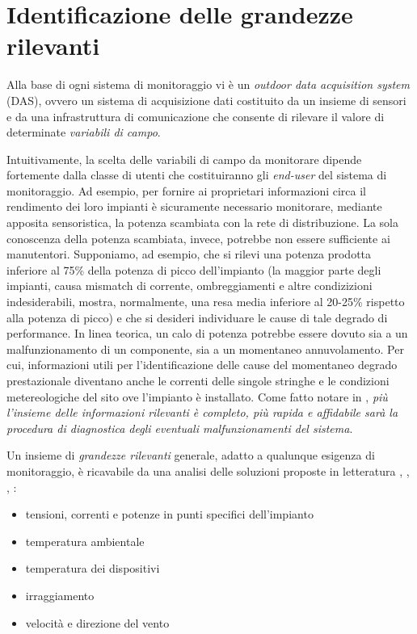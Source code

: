 %
\section{Identificazione delle grandezze rilevanti}
Alla base di ogni sistema di monitoraggio vi \`e un \emph{outdoor data acquisition system} 
(DAS), ovvero un sistema di acquisizione dati costituito da un insieme di sensori 
e da una infrastruttura di comunicazione che consente di rilevare il valore di 
determinate \emph{variabili di campo}. 
%

%
Intuitivamente, la scelta delle variabili di campo da monitorare dipende fortemente dalla 
classe di utenti che costituiranno gli \emph{end-user} del sistema di monitoraggio.
%
Ad esempio, per fornire ai proprietari informazioni circa il rendimento dei loro impianti 
\`e sicuramente necessario monitorare, mediante apposita sensoristica, la potenza scambiata 
con la rete di distribuzione. La sola conoscenza della potenza scambiata, invece, potrebbe 
non essere sufficiente ai manutentori.
%
Supponiamo, ad esempio, che si rilevi una potenza prodotta inferiore al 75\% della potenza di picco
dell'impianto (la maggior parte degli impianti, causa mismatch di corrente, ombreggiamenti e 
altre condizizioni indesiderabili, mostra, normalmente, una resa media inferiore al 20-25\% rispetto 
alla potenza di picco\cite{roman06}) e che si desideri individuare le cause di tale degrado 
di performance.
%
In linea teorica, un calo di potenza potrebbe essere dovuto sia a un malfunzionamento 
di un componente, sia a un momentaneo annuvolamento. Per cui, informazioni utili per 
l'identificazione delle cause del momentaneo degrado prestazionale diventano anche le correnti 
delle singole stringhe e le condizioni metereologiche del sito ove l'impianto \`e installato.
%
Come fatto notare in \cite{kolodenny08}, \emph{pi\`u l'insieme delle informazioni rilevanti 
\`e completo, pi\`u rapida e affidabile sar\`a la procedura di diagnostica degli eventuali 
malfunzionamenti del sistema}.
%

%
Un insieme di \emph{grandezze rilevanti} generale, adatto a qualunque esigenza 
di monitoraggio, \`e ricavabile da una analisi delle soluzioni proposte in letteratura
\cite{xiaoli11}, \cite{dirks06}, \cite{kolodenny06}, \cite{aristizabal06}: %
%
\begin{itemize}
\item tensioni, correnti e potenze in punti specifici dell'impianto
\item temperatura ambientale
\item temperatura dei dispositivi
\item irraggiamento
\item velocit\`a e direzione del vento
\end{itemize}
%
%
